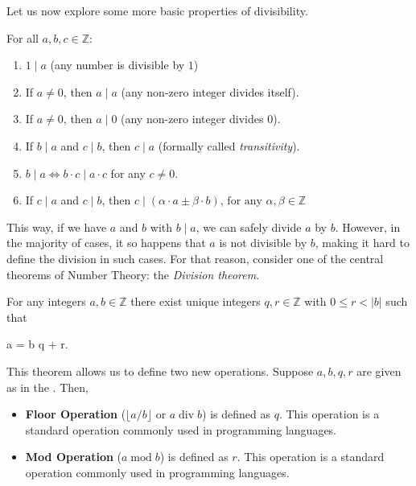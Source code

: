 \documentclass[../lecture-notes-148x210.tex]{subfiles}
\begin{document}
Let us now explore some more basic properties of divisibility. 

\begin{lemma}
    For all $a, b, c \in \mathbb{Z}$:
    \hfill
    \begin{enumerate}
        \item $1 \mid a$ (any number is divisible by $1$)
        \item If $a \neq 0$, then $a \mid a$ (any non-zero integer divides itself).
        \item If $a \neq 0$, then $a \mid 0$ (any non-zero integer divides $0$).
        \item If $b \mid a$ and $c \mid b$, then $c \mid a$ (formally called \emph{transitivity}).
        \item $b \mid a \iff b \cdot c \mid a \cdot c$ for any $c \neq 0$.
        \item If $c \mid a$ and $c \mid b$, then $c \mid (\alpha \cdot a \pm \beta \cdot b)$, $\text{for any } \alpha, \beta \in \mathbb{Z}$
    \end{enumerate}
\end{lemma}

This way, if we have $a$ and $b$ with $b \mid a$, we can safely divide $a$ by
$b$. However, in the majority of cases, it so happens that $a$ is not divisible
by $b$, making it hard to define the division in such cases. For that reason,
consider one of the central theorems of Number Theory: the \emph{Division
theorem}.

\begin{theorem}\label{th:division}
    For any integers $a,b \in \mathbb{Z}$ there exist unique integers $q, r \in \mathbb{Z}$ with $0 \leq r < |b|$ such that 
    \begin{xequation}
        a = b \cdot q + r.
    \end{xequation}
\end{theorem}

This theorem allows us to define two new operations. Suppose $a,b,q,r$ are given
as in the . Then,
\begin{itemize}
    \item \textbf{Floor Operation} ($\lfloor a/b \rfloor$ or $a \; \text{div} \; b$) is defined
    as $q$. This operation is a standard  operation commonly used in programming languages.
    \item \textbf{Mod Operation} ($a \; \text{mod} \; b$) is defined as $r$. This operation is a standard
 operation commonly used in programming languages. 
\end{itemize}
\end{document}
